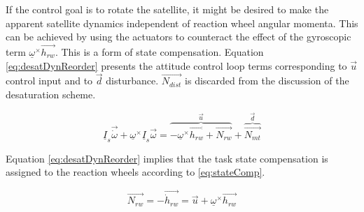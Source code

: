 
If the control goal is to rotate the satellite, it might be desired to make the apparent satellite dynamics independent of reaction wheel angular momenta. This can be achieved by using the actuators to counteract the effect of the gyroscopic term $\underline{\omega}^\times \vec{h_{rw}}$. This is a form of state compensation. Equation \ref{eq:desatDynReorder} presents the attitude control loop terms corresponding to $\vec{u}$ control input and to $\vec{d}$ disturbance. $\vec{N_{dist}}$ is discarded from the discussion of the desaturation scheme.

\begin{equation}
\underline I_{s} \vec{\dot{\omega}} + \underline{\omega}^\times\underline I_{s} \vec{\omega} =    \overbrace{-\underline{\omega}^\times\vec{h_{rw}} + \vec{N_{rw}}}^{\vec{u}} +  \overbrace{\vec{N_{mt}}}^{\vec{d}}
\label{eq:desatDynReorder}
\end{equation}

Equation \ref{eq:desatDynReorder} implies that the task state compensation is assigned to the reaction wheels according to \ref{eq:stateComp}.

\begin{equation}
\vec{N_{rw}} = -\vec{\dot{h}_{rw}} = \vec{u} +  \underline{\omega}^\times\vec{h_{rw}}
\label{eq:stateComp}
\end{equation}


